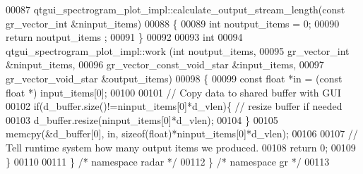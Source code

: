 \begin{DoxyCode}
00087     qtgui_spectrogram_plot_impl::calculate_output_stream_length(\textcolor{keyword}{const} gr\_vector\_int &ninput\_items)
00088     \{
00089       \textcolor{keywordtype}{int} noutput\_items = 0;
00090       \textcolor{keywordflow}{return} noutput\_items ;
00091     \}
00092 
00093     \textcolor{keywordtype}{int}
00094     qtgui_spectrogram_plot_impl::work (\textcolor{keywordtype}{int} noutput\_items,
00095                        gr\_vector\_int &ninput\_items,
00096                        gr\_vector\_const\_void\_star &input\_items,
00097                        gr\_vector\_void\_star &output\_items)
00098     \{
00099         \textcolor{keyword}{const} \textcolor{keywordtype}{float} *in = (\textcolor{keyword}{const} \textcolor{keywordtype}{float} *) input\_items[0];
00100 
00101         \textcolor{comment}{// Copy data to shared buffer with GUI}
00102         \textcolor{keywordflow}{if}(d_buffer.size()!=ninput\_items[0]*d_vlen)\{ \textcolor{comment}{// resize buffer if needed}
00103             d_buffer.resize(ninput\_items[0]*d_vlen);
00104         \}
00105         memcpy(&d_buffer[0], in, \textcolor{keyword}{sizeof}(\textcolor{keywordtype}{float})*ninput\_items[0]*d_vlen);
00106 
00107         \textcolor{comment}{// Tell runtime system how many output items we produced.}
00108         \textcolor{keywordflow}{return} 0;
00109     \}
00110 
00111   \} \textcolor{comment}{/* namespace radar */}
00112 \} \textcolor{comment}{/* namespace gr */}
00113 
\end{DoxyCode}
